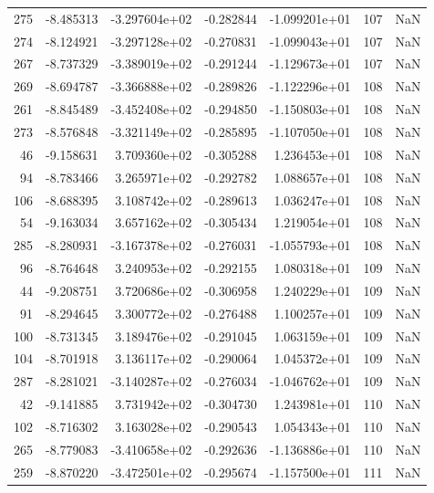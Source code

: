 \begin{tabular}{rrrrrrr}
 275 &  -8.485313 & -3.297604e+02 & -0.282844 & -1.099201e+01 &         107 & NaN \\
 274 &  -8.124921 & -3.297128e+02 & -0.270831 & -1.099043e+01 &         107 & NaN \\
 267 &  -8.737329 & -3.389019e+02 & -0.291244 & -1.129673e+01 &         107 & NaN \\
 269 &  -8.694787 & -3.366888e+02 & -0.289826 & -1.122296e+01 &         108 & NaN \\
 261 &  -8.845489 & -3.452408e+02 & -0.294850 & -1.150803e+01 &         108 & NaN \\
 273 &  -8.576848 & -3.321149e+02 & -0.285895 & -1.107050e+01 &         108 & NaN \\
  46 &  -9.158631 &  3.709360e+02 & -0.305288 &  1.236453e+01 &         108 & NaN \\
  94 &  -8.783466 &  3.265971e+02 & -0.292782 &  1.088657e+01 &         108 & NaN \\
 106 &  -8.688395 &  3.108742e+02 & -0.289613 &  1.036247e+01 &         108 & NaN \\
  54 &  -9.163034 &  3.657162e+02 & -0.305434 &  1.219054e+01 &         108 & NaN \\
 285 &  -8.280931 & -3.167378e+02 & -0.276031 & -1.055793e+01 &         108 & NaN \\
  96 &  -8.764648 &  3.240953e+02 & -0.292155 &  1.080318e+01 &         109 & NaN \\
  44 &  -9.208751 &  3.720686e+02 & -0.306958 &  1.240229e+01 &         109 & NaN \\
  91 &  -8.294645 &  3.300772e+02 & -0.276488 &  1.100257e+01 &         109 & NaN \\
 100 &  -8.731345 &  3.189476e+02 & -0.291045 &  1.063159e+01 &         109 & NaN \\
 104 &  -8.701918 &  3.136117e+02 & -0.290064 &  1.045372e+01 &         109 & NaN \\
 287 &  -8.281021 & -3.140287e+02 & -0.276034 & -1.046762e+01 &         109 & NaN \\
  42 &  -9.141885 &  3.731942e+02 & -0.304730 &  1.243981e+01 &         110 & NaN \\
 102 &  -8.716302 &  3.163028e+02 & -0.290543 &  1.054343e+01 &         110 & NaN \\
 265 &  -8.779083 & -3.410658e+02 & -0.292636 & -1.136886e+01 &         110 & NaN \\
 259 &  -8.870220 & -3.472501e+02 & -0.295674 & -1.157500e+01 &         111 & NaN \\

\end{tabular}
